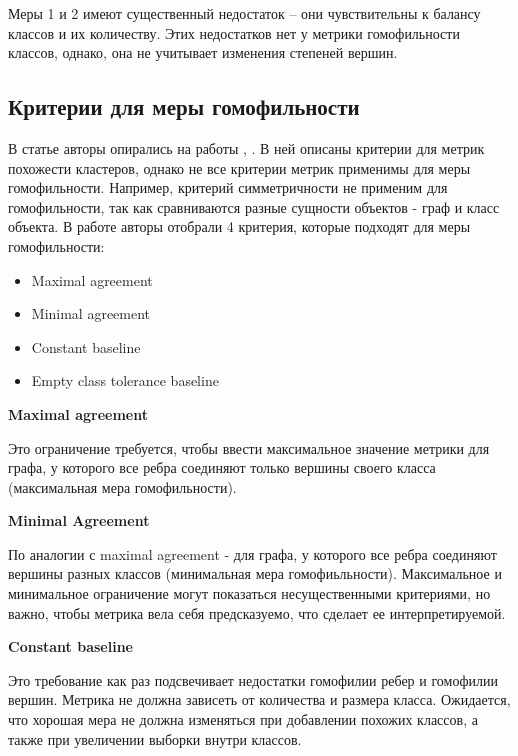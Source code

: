 \documentclass[a4paper,14pt]{article}
\begin{document}
	Меры 1 и 2 имеют существенный недостаток – они чувствительны к балансу классов и их количеству.
	Этих недостатков нет у метрики гомофильности классов, однако, она не учитывает изменения степеней вершин. 
	
	\subsection{Критерии для меры гомофильности}
	
	В статье авторы опирались на работы \cite{gosgens2021good}, \cite{gosgens2021systematic}.
	В ней описаны критерии для метрик похожести кластеров, однако не все критерии метрик применимы для меры гомофильности.
	Например, критерий симметричности не применим для гомофильности, так как сравниваются разные сущности объектов - граф и класс объекта.
	В работе авторы отобрали 4 критерия, которые подходят для меры гомофильности:
	
	\begin{itemize}
		\item Maximal agreement
		
		\item Minimal agreement
		
		\item Constant baseline
		
		\item Empty class tolerance baseline
	\end{itemize}
	
	\textbf{Maximal agreement}
	
	Это ограничение требуется, чтобы ввести максимальное значение метрики для графа, у которого все ребра соединяют только вершины своего класса (максимальная мера гомофильности).
	
	\textbf{Minimal Agreement} 
	
	По аналогии с maximal agreement - для графа, у которого все ребра соединяют вершины разных классов (минимальная мера гомофиьльности).
	Максимальное и минимальное ограничение могут показаться несущественными критериями, но важно, чтобы метрика вела себя предсказуемо, что сделает ее интерпретируемой.
	
	\textbf{Constant baseline}
	
	Это требование как раз подсвечивает недостатки гомофилии ребер и гомофилии вершин.
	Метрика не должна зависеть от количества и размера класса.
	Ожидается, что хорошая мера не должна изменяться при добавлении похожих классов, а также при увеличении выборки внутри классов.
	
\end{document}

